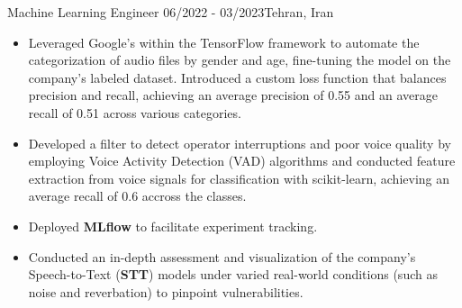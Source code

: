 \resumeSubheadingReza
{Machine Learning Engineer}{}
{06/2022 - 03/2023}{Tehran, Iran}
{
  \vspace{-12pt}
  \begin{itemize}
    \item {Leveraged Google's  within the TensorFlow framework to automate the categorization of audio files by gender and age, fine-tuning the model on the company's labeled dataset. Introduced a custom loss function that balances precision and recall, achieving an average precision of 0.55 and an average recall of 0.51 across various categories.}
    \item {Developed a filter to detect operator interruptions and poor voice quality by employing Voice Activity Detection (VAD) algorithms and conducted feature extraction from voice signals for classification with scikit-learn, achieving an average recall of 0.6 accross the classes.}
    \item {Deployed \textbf{MLflow} to facilitate experiment tracking.}
    \item {Conducted an in-depth assessment and visualization of the company's Speech-to-Text (\textbf{STT}) models under varied real-world conditions (such as noise and reverbation) to pinpoint vulnerabilities.}
  \end{itemize}
}
